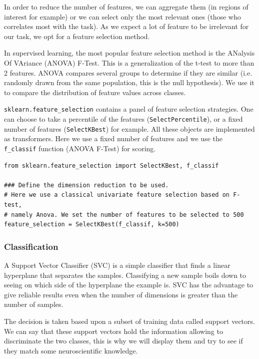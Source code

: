 \documentclass{frontiersSCNS} %
\begin{document}
In order to reduce the number of features, we can aggregate them (in regions of
interest for example) or we can select only the most relevant ones (those who
correlates most with the task). As we expect a lot of feature to be irrelevant
for our task, we opt for a feature selection method.

In supervised learning, the most popular feature selection method is the
ANalysis Of VAriance (ANOVA) F-Test. This is a generalization of the t-test to
more than 2 features. ANOVA compares several
groups to determine if they are similar (i.e. randomly drawn from the same
population, this is the null hypothesis). We use it to compare the distribution
of feature values across classes.

\verb!sklearn.feature_selection! contains a panel of feature selection
strategies. One can choose to take a percentile of the features
(\verb!SelectPercentile!), or a fixed number of features (\verb!SelectKBest!)
for example. All these objects are implemented as transformers.
Here we use a fixed number of features and we use the \verb!f_classif! function
(ANOVA F-Test) for scoring.

\begin{lstlisting}
from sklearn.feature_selection import SelectKBest, f_classif

### Define the dimension reduction to be used.
# Here we use a classical univariate feature selection based on F-test,
# namely Anova. We set the number of features to be selected to 500
feature_selection = SelectKBest(f_classif, k=500)
\end{lstlisting}

\subsubsection{Classification}

A Support Vector Classifier (SVC) is a simple classifier that finds a linear
hyperplane that separates the samples. Classifying a new sample boils down to
seeing on which side of the hyperplane the example is. SVC has the advantage to
give reliable results even when the number of dimensions is greater than the
number of samples.

The decision is taken based upon a subset of training data called support
vectors. We can say that these support vectors hold the information allowing to
discriminate the two classes, this is why we will display them and try to see if
they match some neuroscientific knowledge.
\end{document}
